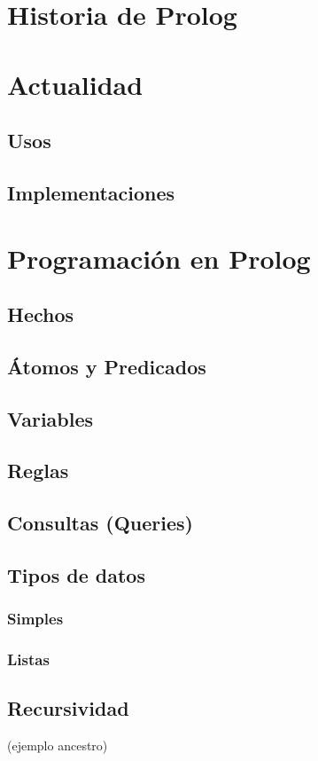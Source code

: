 \documentclass[12pt,titlepage]{article}
\begin{document}
\section{Historia de Prolog}

\section{Actualidad}
\subsection{Usos}
\subsection{Implementaciones}

\section{Programación en Prolog}
\subsection{Hechos}
\subsection{Átomos y Predicados}
\subsection{Variables}
\subsection{Reglas}
\subsection{Consultas (Queries)}
\subsection{Tipos de datos}
\subsubsection{Simples}
\subsubsection{Listas}
\subsection{Recursividad}
(ejemplo ancestro)
\end{document}
